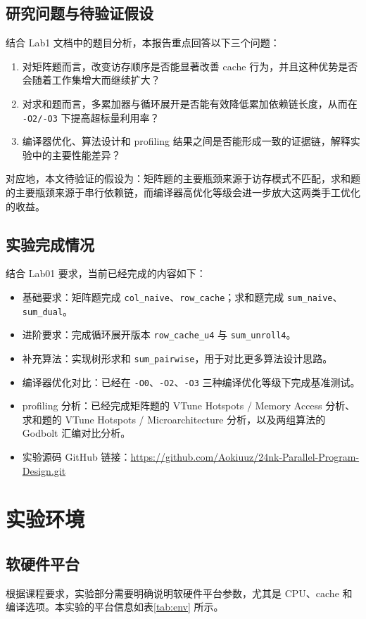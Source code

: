\documentclass[a4paper]{article}
\begin{document}
\subsection{研究问题与待验证假设}
结合 Lab1 文档中的题目分析，本报告重点回答以下三个问题：
\begin{enumerate}
  \item 对矩阵题而言，改变访存顺序是否能显著改善 cache 行为，并且这种优势是否会随着工作集增大而继续扩大？
  \item 对求和题而言，多累加器与循环展开是否能有效降低累加依赖链长度，从而在 \texttt{-O2/-O3} 下提高超标量利用率？
  \item 编译器优化、算法设计和 profiling 结果之间是否能形成一致的证据链，解释实验中的主要性能差异？
\end{enumerate}

对应地，本文待验证的假设为：矩阵题的主要瓶颈来源于访存模式不匹配，求和题的主要瓶颈来源于串行依赖链，而编译器高优化等级会进一步放大这两类手工优化的收益。

\subsection{实验完成情况}
结合 Lab01 要求，当前已经完成的内容如下：
\begin{itemize}
  \item 基础要求：矩阵题完成 \texttt{col\_naive}、\texttt{row\_cache}；求和题完成 \texttt{sum\_naive}、\texttt{sum\_dual}。
  \item 进阶要求：完成循环展开版本 \texttt{row\_cache\_u4} 与 \texttt{sum\_unroll4}。
  \item 补充算法：实现树形求和 \texttt{sum\_pairwise}，用于对比更多算法设计思路。
  \item 编译器优化对比：已经在 \texttt{-O0}、\texttt{-O2}、\texttt{-O3} 三种编译优化等级下完成基准测试。
  \item profiling 分析：已经完成矩阵题的 VTune Hotspots / Memory Access 分析、求和题的 VTune Hotspots / Microarchitecture 分析，以及两组算法的 Godbolt 汇编对比分析。
  \item 实验源码 GitHub 链接：\url{https://github.com/Aokiuuz/24nk-Parallel-Program-Design.git}
\end{itemize}

\section{实验环境}
\subsection{软硬件平台}
根据课程要求，实验部分需要明确说明软硬件平台参数，尤其是 CPU、cache 和编译选项。本实验的平台信息如表\ref{tab:env} 所示。
\end{document}
